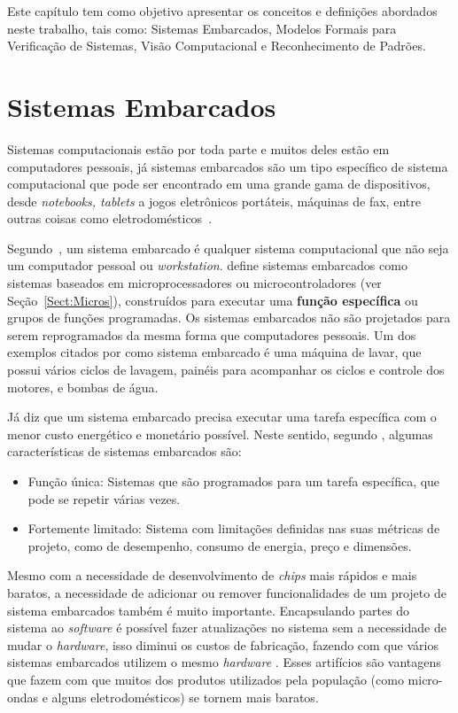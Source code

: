 
\label{chapter:fund_teo}
Este capítulo tem como objetivo apresentar os conceitos e definições abordados neste trabalho, tais como: Sistemas Embarcados, Modelos Formais para Verificação de Sistemas, Visão Computacional e Reconhecimento de Padrões.
  
    
    
\section{Sistemas Embarcados} 

Sistemas computacionais estão por toda parte e muitos deles estão em computadores pessoais, já sistemas embarcados são um tipo específico de sistema computacional que pode ser encontrado em uma grande gama de dispositivos, desde \textit{notebooks, tablets} a jogos eletrônicos portáteis, máquinas de fax, entre outras coisas como eletrodomésticos~\cite{vahid:2002}.

Segundo~, um sistema embarcado é qualquer sistema computacional que não seja um computador pessoal ou \textit{workstation}.  define sistemas embarcados como sistemas baseados em microprocessadores ou microcontroladores (ver Seção~\ref{Sect:Micros}), construídos para executar uma \textbf{função específica} ou grupos de funções programadas. Os sistemas embarcados não são projetados para serem reprogramados da mesma forma que computadores pessoais.
% 
Um dos exemplos citados por \cite{heath:2002} como sistema embarcado é uma máquina de lavar, que possui vários ciclos de lavagem, painéis para acompanhar os ciclos e controle dos motores, e bombas de água.


Já  diz que um sistema embarcado precisa executar uma tarefa específica com o menor custo energético e monetário possível.
Neste sentido, segundo , algumas características de sistemas embarcados são:\begin{itemize}
\item Função única: Sistemas que são programados para um tarefa específica, que pode se repetir várias vezes.
\item Fortemente limitado: Sistema com limitações definidas nas suas métricas de projeto, como de desempenho, consumo de energia, preço e dimensões.
\end{itemize}

Mesmo com a necessidade de desenvolvimento de \textit{chips} mais rápidos e mais baratos, a necessidade de adicionar ou remover funcionalidades de um projeto de sistema embarcados também é muito importante. Encapsulando partes do sistema ao \textit{software} é possível fazer atualizações no sistema sem a necessidade de mudar o \textit{hardware}, isso diminui os custos de fabricação, fazendo com que vários sistemas embarcados utilizem o mesmo \textit{hardware} \cite{heath:2002}. Esses artifícios são vantagens que fazem com que muitos dos produtos utilizados pela população (como micro-ondas e alguns eletrodomésticos) se tornem mais baratos.


